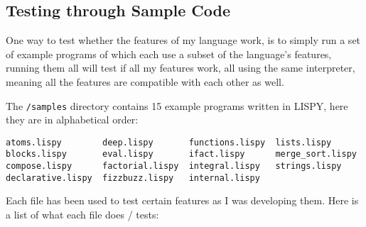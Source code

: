 \documentclass{article}
\newcommand{\code}[1]{\texttt{#1}}
\begin{document}
  \subsection{Testing through Sample Code}
    One way to test whether the features of my language work, is to simply
    run a set of example programs of which each use a subset of the language's
    features, running them all will test if all my features work, all using the
    same interpreter, meaning all the features are compatible with each other
    as well.

    The \code{/samples} directory contains 15 example programs written
    in LISPY, here they are in alphabetical order:
    \begin{Verbatim}
atoms.lispy        deep.lispy       functions.lispy  lists.lispy
blocks.lispy       eval.lispy       ifact.lispy      merge_sort.lispy
compose.lispy      factorial.lispy  integral.lispy   strings.lispy
declarative.lispy  fizzbuzz.lispy   internal.lispy
    \end{Verbatim}

    Each file has been used to test certain features as I was developing them.
    Here is a list of what each file does / tests:
\end{document}

